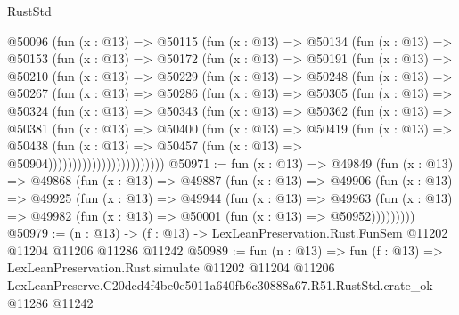\begin{lexlean}{RustStd}
\begin{coremodule}
          @50096
            (fun (x : @13) =>
            @50115
              (fun (x : @13) =>
              @50134
                (fun (x : @13) =>
                @50153
                  (fun (x : @13) =>
                  @50172
                    (fun (x : @13) =>
                    @50191
                      (fun (x : @13) =>
                      @50210
                        (fun (x : @13) =>
                        @50229
                          (fun (x : @13) =>
                          @50248
                            (fun (x : @13) =>
                            @50267
                              (fun (x : @13) =>
                              @50286
                                (fun (x : @13) =>
                                @50305
                                  (fun (x : @13) =>
                                  @50324
                                    (fun (x : @13) =>
                                    @50343
                                      (fun (x : @13) =>
                                      @50362
                                        (fun (x : @13) =>
                                        @50381
                                          (fun (x : @13) =>
                                          @50400
                                            (fun (x : @13) =>
                                            @50419
                                              (fun (x : @13) =>
                                              @50438
                                                (fun (x : @13) =>
                                                @50457
                                                  (fun (x : @13) => @50904))))))))))))))))))))))))
@50971 := fun (x : @13) =>
  @49849
    (fun (x : @13) =>
    @49868
      (fun (x : @13) =>
      @49887
        (fun (x : @13) =>
        @49906
          (fun (x : @13) =>
          @49925
            (fun (x : @13) =>
            @49944
              (fun (x : @13) =>
              @49963
                (fun (x : @13) => @49982 (fun (x : @13) => @50001 (fun (x : @13) => @50952)))))))))
@50979 := (n : @13) ->
  (f : @13) -> LexLeanPreservation.Rust.FunSem @11202 @11204 @11206 @11286 @11242
@50989 := fun (n : @13) =>
  fun (f : @13) =>
  LexLeanPreservation.Rust.simulate
    @11202
    @11204
    @11206
    LexLeanPreserve.C20ded4f4be0e5011a640fb6c30888a67.R51.RustStd.crate_ok
    @11286
    @11242
\end{coremodule}
\end{lexlean}
